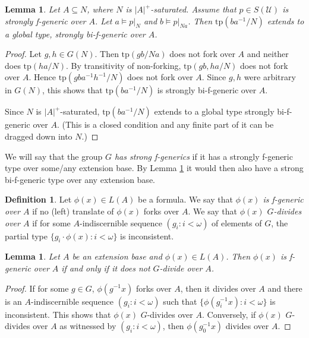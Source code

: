 \documentclass[12pt]{article}
\newtheorem{lemme}[thm]{Lemma}
\theoremstyle{definition}
\newtheorem{defi}[thm]{Definition}
\theoremstyle{mystyle}
\theoremstyle{remark}
\newcommand{\monster}{\mathcal U}
\newcommand{\tp}{\mathrm{tp}}
\begin{document}

\begin{lemme}\label{lem_biexist}
Let $A\subseteq N$, where $N$ is $|A|^+$-saturated. Assume that
$p\in S(\monster)$ is strongly f-generic over $A$. Let $a\models
p|_N$ and $b\models p|_{N a}$. Then $\tp(ba^{-1}/N)$ extends to a
global type, strongly bi-f-generic over $A$.
\end{lemme}
\begin{proof}
Let $g,h\in G(N)$. Then $\tp(gb/Na)$ does not fork over $A$ and neither does $\tp(ha/N)$. By transitivity of non-forking, $\tp(gb,ha/N)$ does not fork over $A$. Hence $\tp(gba^{-1}h^{-1}/N)$ does not fork over $A$. Since $g,h$ were arbitrary in $G(N)$, this shows that $\tp(ba^{-1}/N)$ is strongly bi-f-generic over $A$.

Since $N$ is $|A|^+$-saturated, $\tp(ba^{-1}/N)$ extends to a global type strongly bi-f-generic over $A$. (This is a closed condition and any finite part of it can be dragged down into $N$.)
\end{proof}

We will say that the group \emph{$G$ has strong f-generics} if it has a strongly f-generic type over some/any extension base. By Lemma \ref{lem_biexist} it would then also have a strong bi-f-generic type over any extension base.

\begin{defi}
Let $\phi(x)\in L(A)$ be a formula. We say that \emph{$\phi(x)$ is f-generic over $A$} if no (left) translate of $\phi(x)$ forks over $A$. We say that \emph{$\phi(x)$ $G$-divides over $A$} if for some $A$-indiscernible sequence $(g_i:i<\omega)$ of elements of $G$, the partial type $\{g_i\cdot \phi(x):i<\omega\}$ is inconsistent.
\end{defi}

\begin{lemme}\label{lem_fund1}
Let $A$ be an extension base and $\phi(x)\in L(A)$. Then $\phi(x)$ is f-generic over $A$ if and only if it does not $G$-divide over $A$.
\end{lemme}
\begin{proof}
If for some $g\in G$, $\phi(g^{-1}x)$ forks over $A$, then it divides over $A$ and there is an $A$-indiscernible sequence $(g_i:i<\omega)$ such that $\{\phi(g_i^{-1} x):i<\omega\}$ is inconsistent. This shows that $\phi(x)$ $G$-divides over $A$. Conversely, if $\phi(x)$ $G$-divides over $A$ as witnessed by $(g_i:i<\omega)$, then $\phi(g_0^{-1}x)$ divides over $A$.
\end{proof}
\end{document}

